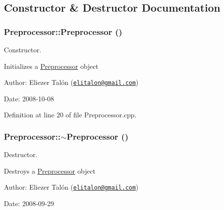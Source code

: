 \subsection{Constructor \& Destructor Documentation}
\hypertarget{class_preprocessor_da966c8b83e7c3bcd8759549c3cdf688}{
\subsubsection[Preprocessor]{\setlength{\rightskip}{0pt plus 5cm}Preprocessor::Preprocessor ()}}
\label{class_preprocessor_da966c8b83e7c3bcd8759549c3cdf688}


Constructor. 

Initializes a \hyperlink{class_preprocessor}{Preprocessor} object

\begin{Desc}
\item[Author:]Eliezer Talón (\href{mailto:elitalon@gmail.com}{\tt elitalon@gmail.com}) \end{Desc}
\begin{Desc}
\item[Date:]2008-10-08 \end{Desc}


Definition at line 20 of file Preprocessor.cpp.\hypertarget{class_preprocessor_3c16724bc9e18b12a45f5a7fe2752b1b}{
\subsubsection[$\sim$Preprocessor]{\setlength{\rightskip}{0pt plus 5cm}Preprocessor::$\sim$Preprocessor ()}}
\label{class_preprocessor_3c16724bc9e18b12a45f5a7fe2752b1b}


Destructor. 

Destroys a \hyperlink{class_preprocessor}{Preprocessor} object

\begin{Desc}
\item[Author:]Eliezer Talón (\href{mailto:elitalon@gmail.com}{\tt elitalon@gmail.com}) \end{Desc}
\begin{Desc}
\item[Date:]2008-09-29 \end{Desc}


